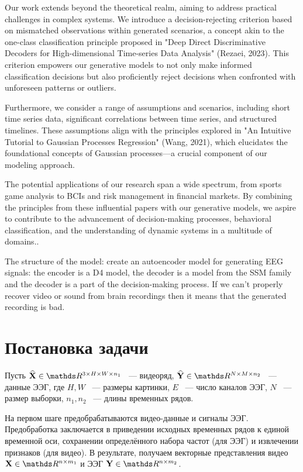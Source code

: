 \documentclass[a4paper, 12pt]{article}
\begin{document}
	Our work extends beyond the theoretical realm, aiming to address practical challenges in complex systems. We introduce a decision-rejecting criterion based on mismatched observations within generated scenarios, a concept akin to the one-class classification principle proposed in "Deep Direct Discriminative Decoders for High-dimensional Time-series Data Analysis" (Rezaei, 2023). This criterion empowers our generative models to not only make informed classification decisions but also proficiently reject decisions when confronted with unforeseen patterns or outliers.
	
	Furthermore, we consider a range of assumptions and scenarios, including short time series data, significant correlations between time series, and structured timelines. These assumptions align with the principles explored in "An Intuitive Tutorial to Gaussian Processes Regression" (Wang, 2021), which elucidates the foundational concepts of Gaussian processes—a crucial component of our modeling approach.
	
	The potential applications of our research span a wide spectrum, from sports game analysis to BCIs and risk management in financial markets. By combining the principles from these influential papers with our generative models, we aspire to contribute to the advancement of decision-making processes, behavioral classification, and the understanding of dynamic systems in a multitude of domains..
	
	The structure of the model: create an autoencoder model for generating EEG signals: the encoder is a D4 model, the decoder is a model from the SSM family and the decoder is a part of the decision-making process. If we can't properly recover video or sound from brain recordings then it means that the generated recording is bad.


\section{Постановка задачи}
Пусть $\widehat{\bX} \in \dR^{3 \times H \times W \times n_1}$ ~--- видеоряд, $\widehat{\bY} \in \dR^{N \times M \times n_2}$ ~--- данные ЭЭГ, где $H, W$ ~--- размеры картинки, $E$ ~--- число каналов ЭЭГ, $N$ ~--- размер выборки, $n_1, n_2$ ~--- длины временных рядов.

На первом шаге предобрабатываются видео-данные и сигналы ЭЭГ. Предобработка заключается в приведении исходных временных рядов к единой временной оси, сохранении определённого набора частот (для ЭЭГ) и извлечении признаков (для видео). В результате, получаем векторные представления видео $\bX \in \dR^{n \times m_1}$ и ЭЭГ $\bY \in \dR^{n \times m_2}$.
\end{document}
